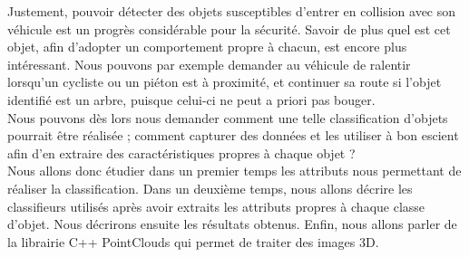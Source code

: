 Justement, pouvoir détecter des objets susceptibles d'entrer en collision avec son véhicule est un progrès considérable pour la sécurité. Savoir de plus quel est cet objet, afin d'adopter un comportement propre à chacun, est encore plus intéressant. Nous pouvons par exemple demander au véhicule de ralentir lorsqu'un cycliste ou un piéton est à proximité, et continuer sa route si l'objet identifié est un arbre, puisque celui-ci ne peut a priori pas bouger.\\

Nous pouvons dès lors nous demander comment une telle classification d'objets pourrait être réalisée ; comment capturer des données et les utiliser à bon escient afin d'en extraire des caractéristiques propres à chaque objet ?\\

Nous allons donc étudier dans un premier temps les attributs nous permettant de réaliser la classification. Dans un deuxième temps, nous allons décrire les classifieurs utilisés après avoir extraits les attributs propres à chaque classe d'objet. Nous décrirons ensuite les résultats obtenus. Enfin, nous allons parler de la librairie C++ PointClouds qui permet de traiter des images 3D.\\